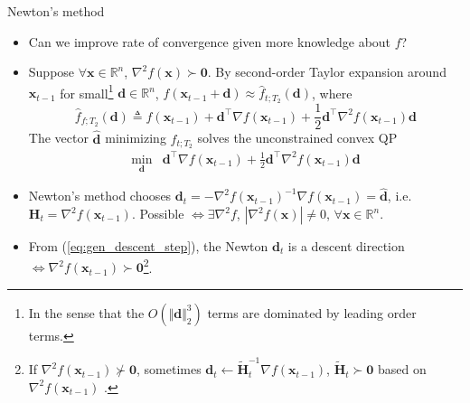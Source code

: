 \documentclass{beamer}
\numberwithin{equation}{section}
\newcommand{\aref}[1]{\alert{\ref{#1}}}
\begin{document}
\begin{frame}{Newton's method}
    \begin{itemize}
        \item
        Can we improve rate of convergence given more knowledge about $ f $?

        \item
        Suppose $ \forall \mathbf{x} \in \mathbb{R}^n $,
        $ \nabla^2f(\mathbf{x}) \succ \mathbf{0} $. By second-order Taylor
        expansion around $ \mathbf{x}_{t - 1} $ for small\footnote{
            In the sense that the $ O(\Vert\mathbf{d}\Vert_2^3) $ terms are
            dominated by leading order terms.        
        } $ \mathbf{d} \in \mathbb{R}^n $, $ f(\mathbf{x}_{t - 1} +
        \mathbf{d}) \approx \hat{f}_{t; T_2}(\mathbf{d}) $, where
        \begin{equation*}
            \hat{f}_{f; T_2}(\mathbf{d}) \triangleq f(\mathbf{x}_{t - 1}) +
                \mathbf{d}^\top\nabla f(\mathbf{x}_{t - 1}) +
                \frac{1}{2}\mathbf{d}^\top
                \nabla^2f(\mathbf{x}_{t - 1})\mathbf{d}
        \end{equation*}
        The vector $ \hat{\mathbf{d}} $ minimizing $ \hat{f}_{t; T_2} $ solves
        the unconstrained convex QP
        \begin{equation} \label{eq:newton_descent_opt}
            \begin{array}{ll}
                \displaystyle\min_{\mathbf{d}} &
                    \mathbf{d}^\top\nabla f(\mathbf{x}_{t - 1}) +
                    \frac{1}{2}\mathbf{d}^\top
                    \nabla^2f(\mathbf{x}_{t - 1})\mathbf{d}
            \end{array}
        \end{equation}

        \item
        Newton's method chooses $ \mathbf{d}_t =
        -\nabla^2f(\mathbf{x}_{t - 1})^{-1}\nabla f(\mathbf{x}_{t - 1}) =
        \hat{\mathbf{d}} $, i.e. $ \mathbf{H}_t =
        \nabla^2f(\mathbf{x}_{t - 1}) $. Possible $ \Leftrightarrow
        \exists\nabla^2f $, $ \left|\nabla^2f(\mathbf{x})\right| \ne 0 $,
        $ \forall \mathbf{x} \in \mathbb{R}^n $.


        \item
        From (\aref{eq:gen_descent_step}), the Newton $ \mathbf{d}_t $ is a
        descent direction $ \Leftrightarrow \nabla^2f(\mathbf{x}_{t - 1})
        \succ \mathbf{0} $\footnote{
            If $ \nabla^2 f(\mathbf{x}_{t - 1}) \not\succ \mathbf{0} $,
            sometimes $ \mathbf{d}_t \leftarrow \tilde{\mathbf{H}}_t^{-1}\nabla f(\mathbf{x}_{t - 1}) $, $ \tilde{\mathbf{H}}_t \succ \mathbf{0} $ based on $ \nabla^2f(\mathbf{x}_{t - 1}) $ \cite{nocedal_opt}.
        }.
    \end{itemize}

    \bigskip
\end{frame}
\end{document}
